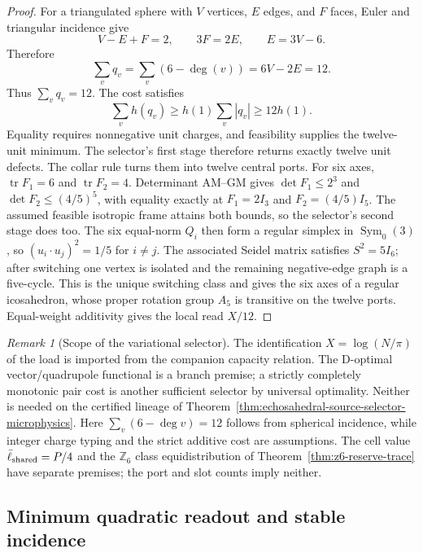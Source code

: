 \documentclass[11pt]{article}
\theoremstyle{remark}
\newtheorem{remark}[theorem]{Remark}
\theoremstyle{plain}
\begin{document}
\begin{proof}
For a triangulated sphere with \(V\) vertices, \(E\) edges, and \(F\) faces,
Euler and triangular incidence give
\[
V-E+F=2,\qquad 3F=2E,\qquad E=3V-6.
\]
Therefore
\[
\sum_v q_v
=
\sum_v(6-\deg(v))
=6V-2E
=12.
\]
Thus \(\sum_vq_v=12\). The cost satisfies
\[
 \sum_vh(q_v)\ge h(1)\sum_v|q_v|\ge12h(1).
\]
Equality requires nonnegative unit charges, and feasibility supplies the
twelve-unit minimum.  The selector's first stage therefore returns exactly
twelve unit defects. The collar rule turns them into twelve central ports.
For six axes, \(\operatorname{tr}F_1=6\) and
\(\operatorname{tr}F_2=4\). Determinant AM--GM gives
\(\det F_1\le2^3\) and \(\det F_2\le(4/5)^5\), with equality exactly at
\(F_1=2I_3\) and \(F_2=(4/5)I_5\).  The assumed feasible isotropic frame
attains both bounds, so the selector's second stage does too. The six
equal-norm \(Q_i\) then form a
regular simplex in \(\operatorname{Sym}_0(3)\), so
\((u_i\cdot u_j)^2=1/5\) for \(i\ne j\). The associated Seidel matrix satisfies
\(S^2=5I_6\); after switching one vertex is isolated and the remaining
negative-edge graph is a five-cycle. This is the unique switching class and
gives the six axes of a regular icosahedron, whose proper
rotation group \(A_5\) is transitive on the twelve ports. Equal-weight
additivity gives the local read \(X/12\).
\end{proof}

\begin{remark}[Scope of the variational selector]
The identification \(X=\log(N/\pi)\) of the load is imported from the
companion capacity relation. The D-optimal vector/quadrupole functional is a
branch premise; a strictly completely monotonic pair cost is another
sufficient selector by universal optimality. Neither is needed on the
certified lineage of
Theorem~\ref{thm:echosahedral-source-selector-microphysics}. Here
\(\sum_v(6-\deg v)=12\) follows from spherical incidence, while integer charge
typing and the strict additive cost are assumptions. The cell value
\(\bar\ell_{\rm shared}=P/4\) and the \(\mathbb Z_6\) class equidistribution
of Theorem~\ref{thm:z6-reserve-trace} have separate premises; the port and
slot counts imply neither.
\end{remark}

\subsection{Minimum quadratic readout and stable incidence}
\label{subsec:minimum-quadratic-readout}
\end{document}
